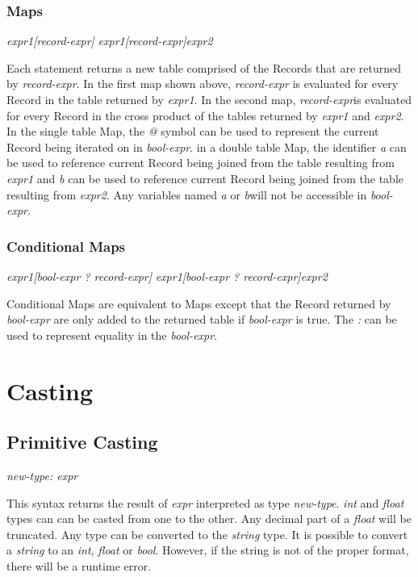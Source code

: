 \subsubsection{Maps}
\begin{center}
\textsl{expr1[record-expr]}
\textsl{expr1[record-expr]expr2}
\end{center}
Each statement returns a new table comprised of the Records that are returned by \textsl{record-expr}. In the first
map shown above, \textsl{record-expr} is evaluated for every Record in the table returned by \textsl{expr1}.
In the second map, \textsl{record-expr}is evaluated for every Record in the cross product of the tables returned by
\textsl{expr1} and \textsl{expr2}. In the single table Map, the \textsl{@} symbol can be used to represent the current
Record being iterated on in \textsl{bool-expr}. in a double table Map, the identifier \textsl{a} can be used to reference current
Record being joined from the table resulting from \textsl{expr1} and \textsl{b} can be used to reference current
Record being joined from the table resulting from \textsl{expr2}. Any variables named \textsl{a} or \textsl{b}will
not be accessible in \textsl{bool-expr}.

\subsubsection{Conditional Maps}
\begin{center}
\textsl{expr1[bool-expr ? record-expr]}
\textsl{expr1[bool-expr ? record-expr]expr2}
\end{center}
Conditional Maps are equivalent to Maps except that the Record returned by \textsl{bool-expr} are only added 
to the returned table if \textsl{bool-expr} is true. The \textsl{:} can be used to represent equality in the \textsl{bool-expr}.

\section{Casting}
\subsection{Primitive Casting}
\begin{center}
\textsl{new-type: expr}
\end{center}
This syntax returns the result of \textsl{expr} interpreted as type \textsl{new-type}. \textsl{int} and 
\textsl{float} types can can be casted from one to the other. Any decimal part of a \textsl{float} will be 
truncated. Any type can be converted to the \textsl{string} type. It is possible to convert a \textsl{string} 
to an \textsl{int}, \textsl{float} or \textsl{bool}. However, if the string is not of the proper format, there 
will be a runtime error.

